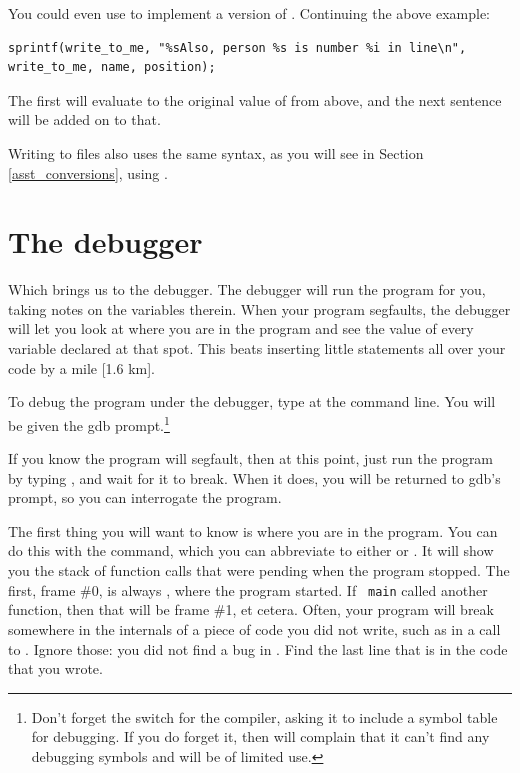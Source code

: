 \documentclass[12pt]{article}
\makeatletter
\def\ttind#1{\index{#1@\cinline{#1}}\cinline{#1}}
\makeatother
\begin{document}
You could even use  to implement a version of . Continuing the above example:
\begin{lstlisting}
sprintf(write_to_me, "%sAlso, person %s is number %i in line\n", write_to_me, name, position);
\end{lstlisting}
The first  will evaluate to the original value of  from above, and the next
sentence will be added on to that.

Writing to files also uses the same syntax, as you will see in Section \ref{asst_conversions}, using \ttind{fprintf}.

\section{The debugger}   \label{debug}
Which brings us to the debugger. The debugger will run the program for
you, taking notes on the variables therein. When your program segfaults,
the debugger will let you look at where you
are in the program and see the value of every variable declared at that
spot. This beats inserting little  statements all over your
code by a mile [1.6 km].

To debug the program  under the debugger, type  at the command line.  You will be given the gdb
prompt.\footnote{Don't forget the  switch for the
compiler, asking it to include a symbol table for debugging. If you
do forget it, then  will complain that it can't find any
debugging symbols and will be of limited use.}

If you know the program will segfault, then at this point, just run the program
by typing , and wait for it to break. When it does, you will be
returned to gdb's prompt, so you can interrogate the program.




The first thing you will want to know is where you are in the program. You
can do this with the  command, which you can abbreviate to
either  or . It will show you the stack of function
calls that were pending when the program stopped.  The first, frame
\#0, is always , where the program started. If {\tt
main} called another function, then that will be frame \#1, et cetera.
Often, your program will break somewhere in the internals of a piece of
code you did not write, such as in a call to . Ignore those:
you did not find a bug in . Find the last line that is in
the code that you wrote.
\end{document}

